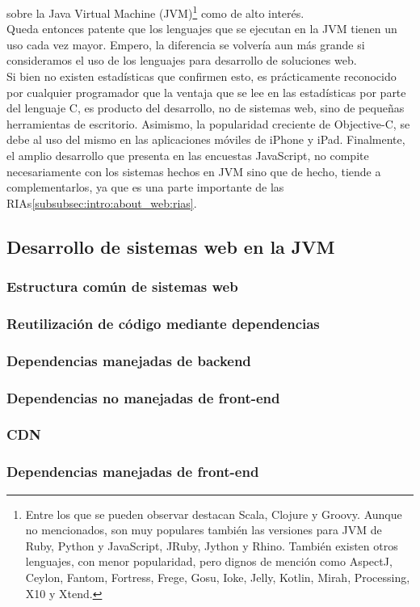 sobre la Java Virtual Machine (JVM)\footnote{
	Entre los que se pueden observar destacan Scala, Clojure y Groovy. Aunque no
	mencionados, son muy populares también las versiones para JVM de Ruby, Python y
	JavaScript, JRuby, Jython y Rhino. También existen otros lenguajes, con menor
	popularidad, pero dignos de mención como AspectJ, Ceylon, Fantom, Fortress, Frege, Gosu,
	Ioke, Jelly, Kotlin, Mirah, Processing, X10 y Xtend.
} como de alto interés.\\
Queda entonces patente que los lenguajes que se ejecutan en la JVM tienen un uso cada vez
mayor. Empero, la diferencia se volvería aun más grande si consideramos el uso de los
lenguajes para desarrollo de soluciones web.\\
Si bien no existen estadísticas que confirmen esto, es prácticamente reconocido por
cualquier programador que la ventaja que se lee en las estadísticas por parte del lenguaje
C, es producto del desarrollo, no de sistemas web, sino de pequeñas herramientas de
escritorio. Asimismo, la popularidad creciente de Objective-C, se debe al uso del mismo en
las aplicaciones móviles de iPhone y iPad. Finalmente, el amplio desarrollo que presenta en
las encuestas JavaScript, no compite necesariamente con los sistemas hechos en JVM sino que
de hecho, tiende a complementarlos, ya que es una parte importante de las
RIAs\ref{subsubsec:intro:about_web:rias}.\\

\subsection{Desarrollo de sistemas web en la JVM}
\label{subsec:intro:jvm_dev}

\subsubsection{Estructura común de sistemas web}
\label{susubbsec:intro:jvm_dev:structure}

\subsubsection{Reutilización de código mediante dependencias}
\label{susubbsec:intro:jvm_dev:dependencies}

\subsubsection{Dependencias manejadas de backend}
\label{susubbsec:intro:jvm_dev:backend_dependencies}

\subsubsection{Dependencias no manejadas de front-end}
\label{susubbsec:intro:jvm_dev:frontend_dependencies}

\subsubsection{CDN}
\label{susubbsec:intro:jvm_dev:cdns}

\subsubsection{Dependencias manejadas de front-end}
\label{susubbsec:intro:jvm_dev:frontend_managed}

